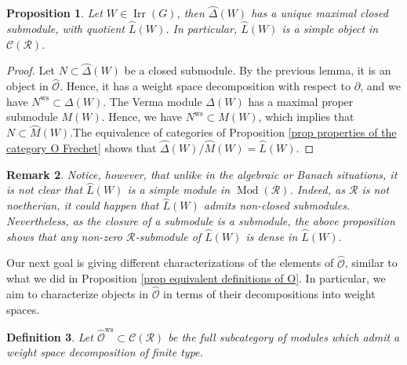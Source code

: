 \documentclass{amsart}
\newtheorem{defi}{ Definition}[subsection]
\newtheorem{prop}[defi]{ Proposition}
\newtheorem{obs}[defi]{{Remark}}
\newcommand{\Mod}{\operatorname{Mod}}
\newcommand{\OX}{\mathcal{O}}
\begin{document}
\begin{prop}
Let $W\in\operatorname{Irr}(G)$, then $\wideparen{\Delta}(W)$ has a unique maximal closed submodule, with quotient $\wideparen{L}(W)$. In particular, $\wideparen{L}(W)$ is a simple object in $\mathcal{C}(\mathscr{R})$.
\end{prop}
\begin{proof}
Let $N\subset \wideparen{\Delta}(W)$ be a closed submodule. By the previous lemma, it is an object in $\wideparen{\OX}$. Hence, it has a weight space decomposition with respect to $\partial$, and we have $N^{\operatorname{ws}}\subset \Delta(W)$. The Verma module $\Delta(W)$ has a maximal proper submodule $M(W)$. Hence, we have $N^{\operatorname{ws}}\subset M(W)$, which implies that $N\subset \wideparen{M}(W)$.The equivalence of categories of Proposition \ref{prop properties of the category O Frechet} shows that $\wideparen{\Delta}(W)/\wideparen{M}(W)=\wideparen{L}(W)$.
\end{proof}
\begin{obs}
 Notice, however, that unlike in the algebraic or Banach situations, it is not clear that $\wideparen{L}(W)$ is a simple module in $\Mod(\mathscr{R})$. Indeed, as $\mathscr{R}$ is not noetherian, it could happen that $\wideparen{L}(W)$ admits non-closed submodules. Nevertheless, as the closure of a submodule is a submodule, the above proposition shows that any non-zero $\mathscr{R}$-submodule of $\wideparen{L}(W)$ is dense in $\wideparen{L}(W)$.   
\end{obs}
 Our next goal is giving  different characterizations of the elements of $\wideparen{\OX}$, similar to what we did in Proposition \ref{prop equivalent definitions of O}. In particular, we aim to characterize objects in $\wideparen{\OX}$ in terms of their decompositions into weight spaces.
 \begin{defi}
Let $\wideparen{\OX}^{\operatorname{ws}}\subset \mathcal{C}(\mathscr{R})$ be the full subcategory of modules which admit a weight space decomposition of finite type. 
\end{defi}
\end{document}
